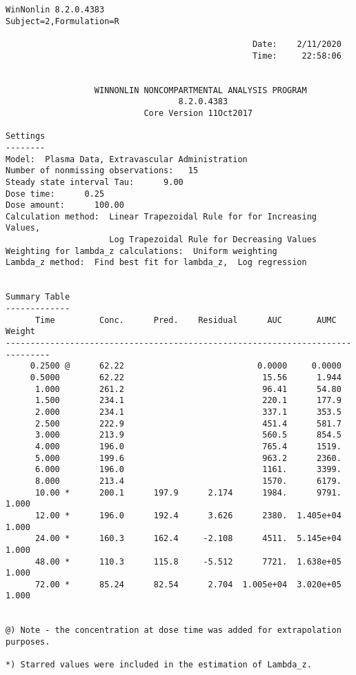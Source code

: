 \documentclass[12pt,a4paper]{article}
\begin{document}
\begin{verbatim}
WinNonlin 8.2.0.4383
Subject=2,Formulation=R

                                                  Date:    2/11/2020
                                                  Time:     22:58:06


                  WINNONLIN NONCOMPARTMENTAL ANALYSIS PROGRAM
                                   8.2.0.4383
                            Core Version 11Oct2017

Settings
--------
Model:  Plasma Data, Extravascular Administration
Number of nonmissing observations:   15
Steady state interval Tau:      9.00
Dose time:      0.25
Dose amount:      100.00
Calculation method:  Linear Trapezoidal Rule for for Increasing Values,
                     Log Trapezoidal Rule for Decreasing Values
Weighting for lambda_z calculations:  Uniform weighting
Lambda_z method:  Find best fit for lambda_z,  Log regression


Summary Table
-------------
      Time         Conc.      Pred.    Residual      AUC       AUMC      Weight
-------------------------------------------------------------------------------
     0.2500 @      62.22                           0.0000     0.0000
     0.5000        62.22                            15.56      1.944
      1.000        261.2                            96.41      54.80
      1.500        234.1                            220.1      177.9
      2.000        234.1                            337.1      353.5
      2.500        222.9                            451.4      581.7
      3.000        213.9                            560.5      854.5
      4.000        196.0                            765.4      1519.
      5.000        199.6                            963.2      2360.
      6.000        196.0                            1161.      3399.
      8.000        213.4                            1570.      6179.
      10.00 *      200.1      197.9      2.174      1984.      9791.      1.000
      12.00 *      196.0      192.4      3.626      2380.  1.405e+04      1.000
      24.00 *      160.3      162.4     -2.108      4511.  5.145e+04      1.000
      48.00 *      110.3      115.8     -5.512      7721.  1.638e+05      1.000
      72.00 *      85.24      82.54      2.704  1.005e+04  3.020e+05      1.000


@) Note - the concentration at dose time was added for extrapolation purposes.

*) Starred values were included in the estimation of Lambda_z.



\end{verbatim}
\end{document}
